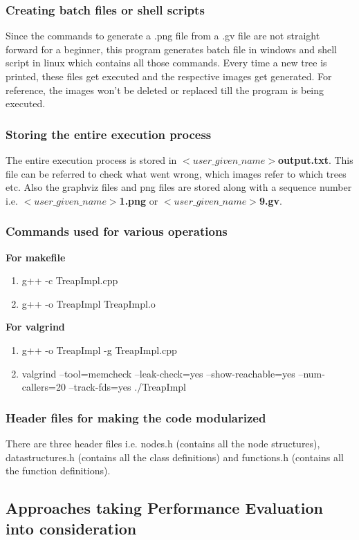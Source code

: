 \documentclass{article}
\begin{document}
\subsubsection{Creating batch files or shell scripts}
Since the commands to generate a .png file from a .gv file are not straight forward for a beginner, this program generates batch file in windows and shell script in linux which contains all those commands. Every time a new tree is printed, these files get executed and the respective images get generated. For reference, the images won't be deleted or replaced till the program is being executed.
\subsubsection{Storing the entire execution process}
The entire execution process is stored in \textbf{$<user\_given\_name>$output.txt}. This file can be referred to check what went wrong, which images refer to which trees etc. Also the graphviz files and png files are stored along with a sequence number i.e. \textbf{$<user\_given\_name>$1.png} or \textbf{$<user\_given\_name>$9.gv}.
\subsubsection{Commands used for various operations}
\textbf{For makefile}
\begin{enumerate}
	\item g++ -c TreapImpl.cpp
	\item g++ -o TreapImpl TreapImpl.o
\end{enumerate}
\textbf{For valgrind}
\begin{enumerate}
	\item g++ -o TreapImpl -g TreapImpl.cpp
	\item valgrind --tool=memcheck --leak-check=yes --show-reachable=yes --num-callers=20 --track-fds=yes ./TreapImpl
\end{enumerate}
\subsubsection{Header files for making the code modularized}
There are three header files i.e. nodes.h (contains all the node structures), datastructures.h (contains all the class definitions) and functions.h (contains all the function definitions).
\subsection{Approaches taking Performance Evaluation into consideration}
\end{document}
